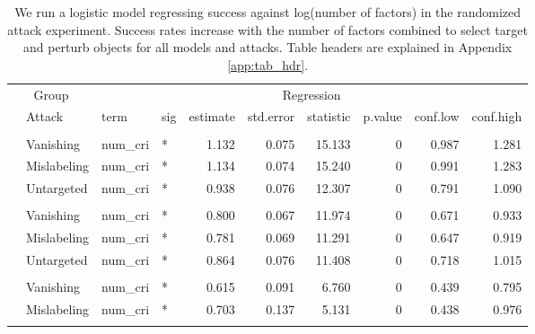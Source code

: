 \begin{longtable}[t]{llllrrrrrr}
\caption{\label{tab:num_cri_table}We run a logistic model regressing success against log(number of factors) in the randomized attack experiment. Success rates increase with the number of factors combined to select target and perturb objects for all models and attacks. Table headers are explained in Appendix \ref{app:tab_hdr}.}\\
\toprule
\multicolumn{2}{c}{Group} & \multicolumn{8}{c}{Regression} \\
\cmidrule(l{3pt}r{3pt}){1-2} \cmidrule(l{3pt}r{3pt}){3-10}
 & Attack & term & sig & estimate & std.error & statistic & p.value & conf.low & conf.high\\
\midrule
\addlinespace[0.3em]
\multicolumn{10}{l}{\textbf{YOLOv3}}\\
\hspace{1em} & Vanishing & num\_cri & * & 1.132 & 0.075 & 15.133 & 0 & 0.987 & 1.281\\
\cmidrule{2-10}\nopagebreak
\hspace{1em} & Mislabeling & num\_cri & * & 1.134 & 0.074 & 15.240 & 0 & 0.991 & 1.283\\
\cmidrule{2-10}\nopagebreak
\hspace{1em} & Untargeted & num\_cri & * & 0.938 & 0.076 & 12.307 & 0 & 0.791 & 1.090\\
\cmidrule{1-10}\pagebreak[0]
\addlinespace[0.3em]
\multicolumn{10}{l}{\textbf{SSD}}\\
\hspace{1em} & Vanishing & num\_cri & * & 0.800 & 0.067 & 11.974 & 0 & 0.671 & 0.933\\
\cmidrule{2-10}\nopagebreak
\hspace{1em} & Mislabeling & num\_cri & * & 0.781 & 0.069 & 11.291 & 0 & 0.647 & 0.919\\
\cmidrule{2-10}\nopagebreak
\hspace{1em} & Untargeted & num\_cri & * & 0.864 & 0.076 & 11.408 & 0 & 0.718 & 1.015\\
\cmidrule{1-10}\pagebreak[0]
\addlinespace[0.3em]
\multicolumn{10}{l}{\textbf{RetinaNet}}\\
\hspace{1em} & Vanishing & num\_cri & * & 0.615 & 0.091 & 6.760 & 0 & 0.439 & 0.795\\
\cmidrule{2-10}\nopagebreak
\hspace{1em} & Mislabeling & num\_cri & * & 0.703 & 0.137 & 5.131 & 0 & 0.438 & 0.976\\
\cmidrule{2-10}\nopagebreak

\end{longtable}
